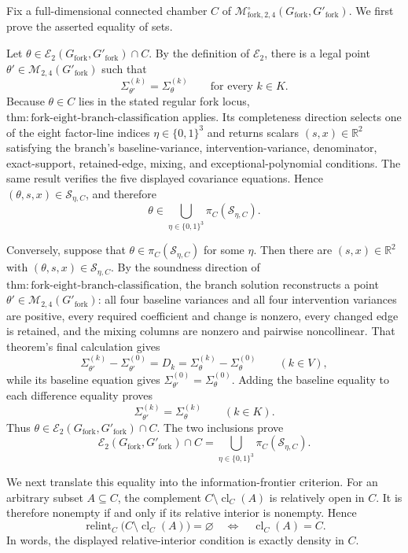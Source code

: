 Fix a full-dimensional connected chamber \(C\) of
\(\mathcal M^{\circ}_{\mathrm{fork},2,4}(G_{\mathrm{fork}},G'_{\mathrm{fork}})\).
We first prove the asserted equality of sets.

Let
\(\theta\in\mathcal E_2(G_{\mathrm{fork}},G'_{\mathrm{fork}})\cap C\).
By the definition of \(\mathcal E_2\), there is a legal point
\(\theta'\in\mathcal M_{2,4}(G'_{\mathrm{fork}})\) such that
\[
 \Sigma_{\theta'}^{(k)}=\Sigma_{\theta}^{(k)}
 \qquad\text{for every }k\in K.
\]
Because \(\theta\in C\) lies in the stated regular fork locus,
\(\mathrm{thm:fork\text{-}eight\text{-}branch\text{-}classification}\) applies.  Its
completeness direction selects one of the eight factor-line indices
\(\eta\in\{0,1\}^3\) and returns scalars \((s,x)\in\mathbb R^2\) satisfying
the branch's baseline-variance, intervention-variance, denominator,
exact-support, retained-edge, mixing, and exceptional-polynomial conditions.
The same result verifies the five displayed covariance equations.  Hence
\((\theta,s,x)\in\mathscr S_{\eta,C}\), and therefore
\[
 \theta\in
 \bigcup_{\eta\in\{0,1\}^3}\pi_C(\mathscr S_{\eta,C}).
\]

Conversely, suppose that
\(\theta\in\pi_C(\mathscr S_{\eta,C})\) for some \(\eta\).  Then there are
\((s,x)\in\mathbb R^2\) with \((\theta,s,x)\in\mathscr S_{\eta,C}\).
By the soundness direction of
\(\mathrm{thm:fork\text{-}eight\text{-}branch\text{-}classification}\), the
branch solution reconstructs a point
\(\theta'\in\mathcal M_{2,4}(G'_{\mathrm{fork}})\): all four baseline
variances and all four intervention variances are positive, every required
coefficient and change is nonzero, every changed edge is retained, and the
mixing columns are nonzero and pairwise noncollinear.  That theorem's final
calculation gives
\[
 \Sigma_{\theta'}^{(k)}-\Sigma_{\theta'}^{(0)}
 =D_k
 =\Sigma_{\theta}^{(k)}-\Sigma_{\theta}^{(0)}
 \qquad(k\in V),
\]
while its baseline equation gives
\(\Sigma_{\theta'}^{(0)}=\Sigma_{\theta}^{(0)}\).  Adding the baseline
equality to each difference equality proves
\[
 \Sigma_{\theta'}^{(k)}=\Sigma_{\theta}^{(k)}
 \qquad(k\in K).
\]
Thus \(\theta\in\mathcal E_2(G_{\mathrm{fork}},G'_{\mathrm{fork}})\cap C\).
The two inclusions prove
\[
 \mathcal E_2(G_{\mathrm{fork}},G'_{\mathrm{fork}})\cap C
 =\bigcup_{\eta\in\{0,1\}^3}\pi_C(\mathscr S_{\eta,C}).
\]

We next translate this equality into the information-frontier criterion.
For an arbitrary subset \(A\subseteq C\), the complement
\(C\setminus\operatorname{cl}_C(A)\) is relatively open in \(C\).  It is
therefore nonempty if and only if its relative interior is nonempty.  Hence
\[
 \operatorname{relint}_C\bigl(C\setminus\operatorname{cl}_C(A)\bigr)
 =\varnothing
 \quad\Longleftrightarrow\quad
 \operatorname{cl}_C(A)=C.
\]
In words, the displayed relative-interior condition is exactly density in
\(C\).

